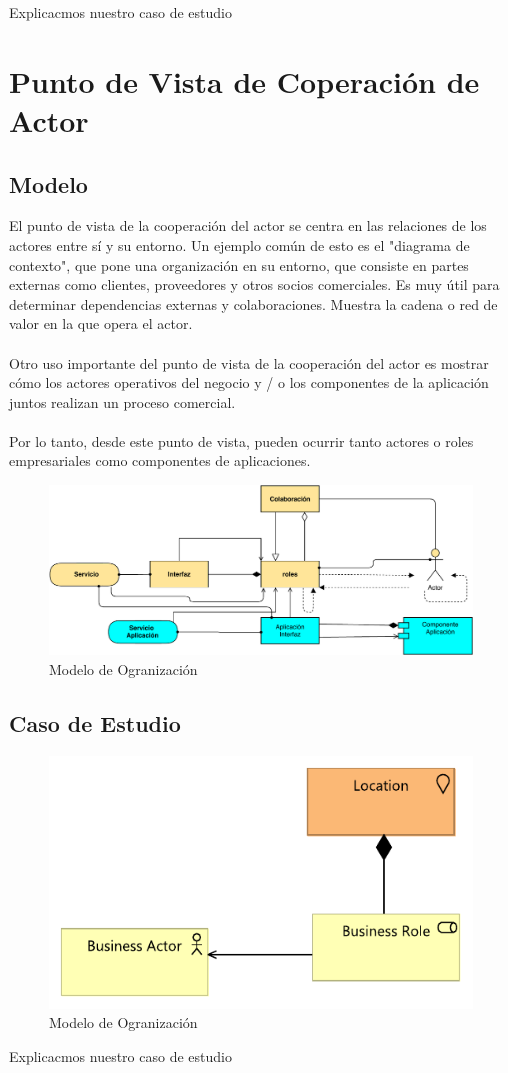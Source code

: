  Explicacmos nuestro caso de estudio
\newpage
\section{Punto de Vista de Coperación de Actor}
\subsection{Modelo}
El punto de vista de la cooperación del actor se centra en las relaciones de los actores entre sí y su entorno. Un ejemplo común de esto es el "diagrama de contexto", que pone una organización en su entorno, que consiste en partes externas como clientes, proveedores y otros socios comerciales. Es muy útil para determinar dependencias externas y colaboraciones. Muestra la cadena o red de valor en la que opera el actor.\\\\
 
Otro uso importante del punto de vista de la cooperación del actor es mostrar cómo los actores operativos del negocio y / o los componentes de la aplicación juntos realizan un proceso comercial.
\\\\
Por lo tanto, desde este punto de vista, pueden ocurrir tanto actores o roles empresariales como componentes de aplicaciones.

\begin{figure}[h!]
	\centering
	\includegraphics[width=1\linewidth]{ARQUITECTURA/imgs/MOrganizacion}
	\caption{Modelo de Ogranización}
\end{figure}


\newpage
\subsection{Caso de Estudio}

\begin{figure}[h!]
	\centering
	\includegraphics[width=.5\linewidth]{ARQUITECTURA/imgs/COrganizacion1}
	\caption{Modelo de Ogranización}
\end{figure}
Explicacmos nuestro caso de estudio
\newpage
